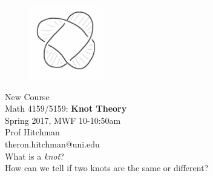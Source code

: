 \documentclass[12pt]{amsart}
\begin{document}
\begin{figure}
  \centering
  \includegraphics[width=0.29\textwidth]{images/checkerboard.png} 
\end{figure}



\noindent
\Large
New Course\\
\Huge
Math 4159/5159: \textbf{Knot Theory}\\
\Large
Spring 2017, MWF 10-10:50am\\
\large
Prof Hitchman\\
theron.hitchman@uni.edu\\[.25in]

\noindent
What is a \emph{knot}?\\ 
How can we tell if two knots
are the same or different?\\[.1in]
\end{document}
